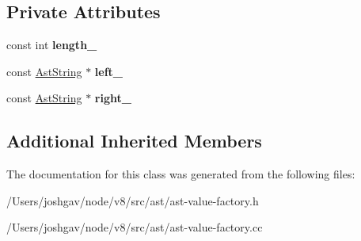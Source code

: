 \subsection*{Private Attributes}
\begin{DoxyCompactItemize}
\item 
const int {\bfseries length\+\_\+}\hypertarget{classv8_1_1internal_1_1_ast_cons_string_a6d356fb087947bc26af1ff37799b9b04}{}\label{classv8_1_1internal_1_1_ast_cons_string_a6d356fb087947bc26af1ff37799b9b04}

\item 
const \hyperlink{classv8_1_1internal_1_1_ast_string}{Ast\+String} $\ast$ {\bfseries left\+\_\+}\hypertarget{classv8_1_1internal_1_1_ast_cons_string_ade04eb2d3ae63270587c70daa11477cc}{}\label{classv8_1_1internal_1_1_ast_cons_string_ade04eb2d3ae63270587c70daa11477cc}

\item 
const \hyperlink{classv8_1_1internal_1_1_ast_string}{Ast\+String} $\ast$ {\bfseries right\+\_\+}\hypertarget{classv8_1_1internal_1_1_ast_cons_string_a4b6ebabfa401fe73f26f59f90170fd4c}{}\label{classv8_1_1internal_1_1_ast_cons_string_a4b6ebabfa401fe73f26f59f90170fd4c}

\end{DoxyCompactItemize}
\subsection*{Additional Inherited Members}


The documentation for this class was generated from the following files\+:\begin{DoxyCompactItemize}
\item 
/\+Users/joshgav/node/v8/src/ast/ast-\/value-\/factory.\+h\item 
/\+Users/joshgav/node/v8/src/ast/ast-\/value-\/factory.\+cc\end{DoxyCompactItemize}
